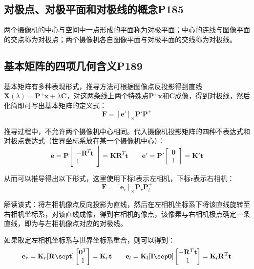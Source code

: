 \documentclass[11pt]{article}
\begin{document}
\subsection{对极点、对极平面和对极线的概念P185}
两个摄像机的中心与空间中一点形成的平面称为对极平面；中心的连线与图像平面的交点称为对极点；两个摄像机各自图像平面与对极平面的交线称为对极线。
\subsection{基本矩阵的四项几何含义P189}
基本矩阵有多种表现形式，推导方法可根据图像点反投影得到直线$\mathbf{X}(\lambda)=\mathbf{P^+x}+\lambda\mathbf{C}$，对这两条线上两个特殊点$\mathbf{P^+x}$和$\mathbf{C}$成像，得到对极线，然后化简即可写出基本矩阵的定义式：
\begin{equation*}
  \mathbf{F}=[\mathbf{e}']_\times\mathbf{P}'\mathbf{P}^+
\end{equation*}\par
推导过程中，不允许两个摄像机中心相同。代入摄像机投影矩阵的四种不表达式和对极点表达式（世界坐标系放在某一个摄像机中心）：
\begin{equation*}
  \mathbf{e}=\mathbf{P}\begin{bmatrix}
    -\mathbf{R}^T\mathbf{t} \\
    1
  \end{bmatrix}=\mathbf{KR}^T\mathbf{t}\qquad\mathbf{e}'=\mathbf{P}'\begin{bmatrix}
    \mathbf{0} \\
    1
  \end{bmatrix}=\mathbf{K}'\mathbf{t}
\end{equation*}\par
从而可以推导得出以下形式，这里使用下标l表示左相机，下标r表示右相机：
\begin{equation*}
  \mathbold{F}=[\mathbf{e}_r]_\times\mathbf{P}_r\mathbf{P}^+_l
\end{equation*}\par
解读该式：将左相机像点反向投影为直线，然后在左相机坐标系下将该直线旋转至右相机坐标系，对该直线成像，得到右相机的像点，该像素与右相机极点确定一条直线，即为与左相机像点对应的对极线。\par
如果取定左相机坐标系与世界坐标系重合，则可以得到：
\begin{equation*}
  \mathbf{e}_r=\mathbf{K}_r\mathbf{[R\sep t]}\begin{bmatrix}
    \mathbf{0}^T \\
    1
  \end{bmatrix}=\mathbf{K}_r\mathbf{t}\qquad\mathbf{e}_l=\mathbf{K}_l\mathbf{[I\sep 0]}\begin{bmatrix}
    -\mathbf{R}^T\mathbf{t} \\
    1
  \end{bmatrix}=\mathbf{K}_l\mathbf{R^\mathrm{T}t}
\end{equation*}\par
\end{document}
